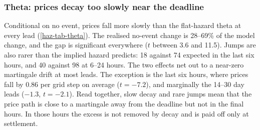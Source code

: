 \subsubsection{Theta: prices decay too slowly near the deadline}\label{haz-res-theta}

Conditional on no event, prices fall more slowly than the flat-hazard theta at every lead
(\cref{haz-tab-theta}). The realised no-event change is 28--69\% of the model change, and the gap is
significant everywhere ($t$ between 3.6 and 11.5). Jumps are also rarer than the implied hazard
predicts: 18 against 74 expected in the last six hours, and 40 against 98 at 6--24 hours. The two
effects net out to a near-zero martingale drift at most leads. The exception is the last six hours,
where prices fall by 0.86\cents{} per grid step on average ($t=-7.2$), and marginally the 14--30 day
leads ($-1.3$\cents, $t=-2.1$).
Read together, slow decay and rare jumps mean that the price path is close to a martingale away from
the deadline but not in the final hours. In those hours the excess is not removed by decay and is
paid off only at settlement.

